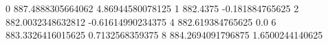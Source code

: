 0 887.4888305664062 4.86944580078125
1 882.4375 -0.181884765625
2 882.0032348632812 -0.61614990234375
4 882.619384765625 0.0
6 883.3326416015625 0.7132568359375
8 884.2694091796875 1.6500244140625
